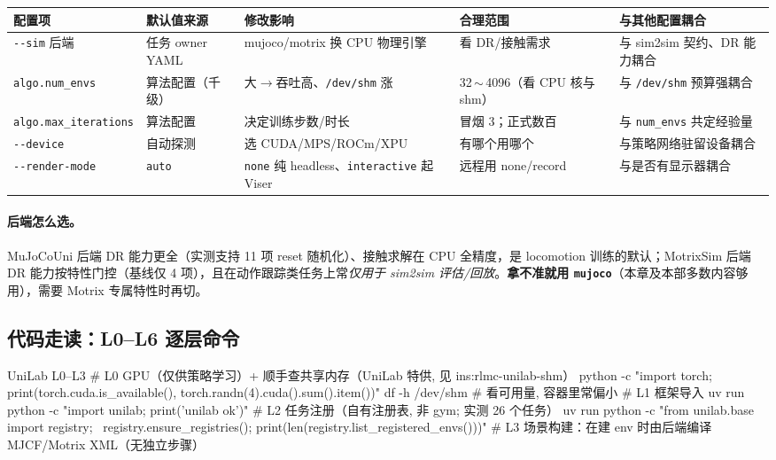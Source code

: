 \begin{center}
\small
\begin{tabular}{@{}p{2.4cm}p{2.4cm}p{3.0cm}p{2.6cm}p{2.6cm}@{}}
\toprule
配置项 & 默认值来源 & 修改影响 & 合理范围 & 与其他配置耦合 \\
\midrule
\verb|--sim| 后端 & 任务 owner YAML & mujoco/motrix 换 CPU 物理引擎 & 看 DR/接触需求 & 与 sim2sim 契约、DR 能力耦合 \\
\verb|algo.num_envs| & 算法配置（千级） & 大$\to$吞吐高、\verb|/dev/shm| 涨 & 32\,$\sim$\,4096（看 CPU 核与 shm） & 与 \verb|/dev/shm| 预算强耦合 \\
\verb|algo.max_iterations| & 算法配置 & 决定训练步数/时长 & 冒烟 3；正式数百 & 与 \verb|num_envs| 共定经验量 \\
\verb|--device| & 自动探测 & 选 CUDA/MPS/ROCm/XPU & 有哪个用哪个 & 与策略网络驻留设备耦合 \\
\verb|--render-mode| & \verb|auto| & \verb|none| 纯 headless、\verb|interactive| 起 Viser & 远程用 none/record & 与是否有显示器耦合 \\
\bottomrule
\end{tabular}
\end{center}

\paragraph{后端怎么选。}MuJoCoUni 后端 DR 能力更全（实测支持 11 项 reset 随机化）、接触求解在 CPU 全精度，是 locomotion 训练的默认；MotrixSim 后端 DR 能力按特性门控（基线仅 4 项），且在动作跟踪类任务上常\emph{仅用于 sim2sim 评估/回放}。\textbf{拿不准就用 \texttt{mujoco}}（本章及本部多数内容够用），需要 Motrix 专属特性时再切。

\subsection{代码走读：L0--L6 逐层命令}

\begin{codebox}[bash]{UniLab L0--L3}
# L0 GPU（仅供策略学习）+ 顺手查共享内存（UniLab 特供, 见 ins:rlmc-unilab-shm）
python -c "import torch; print(torch.cuda.is_available(), torch.randn(4).cuda().sum().item())"
df -h /dev/shm                                  # 看可用量, 容器里常偏小
# L1 框架导入
uv run python -c "import unilab; print('unilab ok')"
# L2 任务注册（自有注册表, 非 gym; 实测 26 个任务）
uv run python -c "from unilab.base import registry; \
    registry.ensure_registries(); print(len(registry.list_registered_envs()))"
# L3 场景构建：在建 env 时由后端编译 MJCF/Motrix XML（无独立步骤）
\end{codebox}

